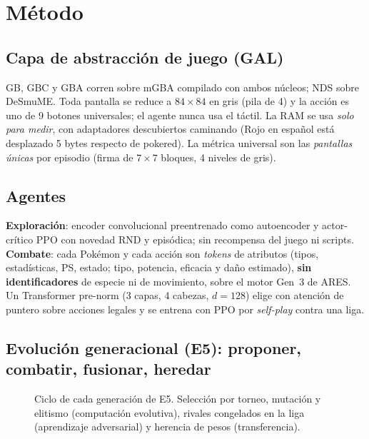 \documentclass[conference]{IEEEtran}
\begin{document}
\section{Método}
\subsection{Capa de abstracción de juego (GAL)}
GB, GBC y GBA corren sobre mGBA compilado con ambos núcleos; NDS sobre DeSmuME. Toda pantalla se reduce a $84\times84$ en gris (pila de 4) y la acción es uno de 9 botones universales; el agente nunca usa el táctil. La RAM se usa \emph{solo para medir}, con adaptadores descubiertos caminando (Rojo en español está desplazado 5 bytes respecto de pokered). La métrica universal son las \emph{pantallas únicas} por episodio (firma de $7\times7$ bloques, 4 niveles de gris).

\subsection{Agentes}
\textbf{Exploración}: encoder convolucional preentrenado como autoencoder \cite{hinton2006ae} y actor-crítico PPO \cite{schulman2017ppo} con novedad RND \cite{burda2018rnd} y episódica; sin recompensa del juego ni scripts. \textbf{Combate}: cada Pokémon y cada acción son \emph{tokens} de atributos (tipos, estadísticas, PS, estado; tipo, potencia, eficacia y daño estimado), \textbf{sin identificadores} de especie ni de movimiento, sobre el motor Gen~3 de ARES. Un Transformer pre-norm (3 capas, 4 cabezas, $d=128$) \cite{vaswani2017attention} elige con atención de puntero sobre acciones legales y se entrena con PPO por \emph{self-play} contra una liga.

\subsection{Evolución generacional (E5): proponer, combatir, fusionar, heredar}
\begin{figure}[t]
\centering
{}
\caption{Ciclo de cada generación de E5. Selección por torneo, mutación y elitismo (computación evolutiva), rivales congelados en la liga (aprendizaje adversarial) y herencia de pesos (transferencia).}
\label{fig:ciclo}
\end{figure}
\end{document}
